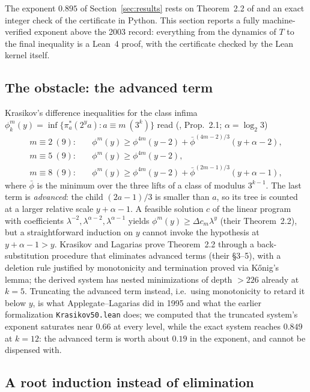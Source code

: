 \documentclass[11pt]{article}
\newcommand{\code}[1]{\texttt{#1}}
\begin{document}
The exponent $0.895$ of Section~\ref{sec:results} rests on
Theorem~2.2 of \cite{kl} and an exact integer check of the certificate
in Python. This section reports a fully machine-verified exponent
above the 2003 record: everything from the dynamics of $T$ to the
final inequality is a Lean~4 proof, with the certificate checked by
the Lean kernel itself.

\subsection*{The obstacle: the advanced term}

Krasikov's difference inequalities for the class infima
$\phi^m_k(y) = \inf\{\pi^*_a(2^y a) : a \equiv m \ (3^k)\}$ read
(\cite{kl}, Prop.~2.1; $\alpha = \log_2 3$)
\begin{align*}
m \equiv 2\ (9):&\quad \phi^m(y) \ge \phi^{4m}(y-2) + \bar\phi^{(4m-2)/3}(y+\alpha-2),\\
m \equiv 5\ (9):&\quad \phi^m(y) \ge \phi^{4m}(y-2),\\
m \equiv 8\ (9):&\quad \phi^m(y) \ge \phi^{4m}(y-2) + \bar\phi^{(2m-1)/3}(y+\alpha-1),
\end{align*}
where $\bar\phi$ is the minimum over the three lifts of a class of
modulus $3^{k-1}$. The last term is \emph{advanced}: the child
$(2a-1)/3$ is smaller than $a$, so its tree is counted at a larger
relative scale $y + \alpha - 1$. A feasible solution $c$ of the linear
program with coefficients $\lambda^{-2}, \lambda^{\alpha-2},
\lambda^{\alpha-1}$ yields $\phi^m(y) \ge \Delta c_m \lambda^y$
(their Theorem~2.2), but a straightforward induction on $y$ cannot
invoke the hypothesis at $y + \alpha - 1 > y$. Krasikov and Lagarias
prove Theorem~2.2 through a back-substitution procedure that
eliminates advanced terms (their \S3--5), with a deletion rule
justified by monotonicity and termination proved via K\H{o}nig's
lemma; the derived system has nested minimizations of depth $> 226$
already at $k = 5$. Truncating the advanced term instead, i.e.\ using
monotonicity to retard it below $y$, is what Applegate--Lagarias did
in 1995 and what the earlier formalization \code{Krasikov50.lean}
does; we computed that the truncated system's exponent saturates near
$0.66$ at every level, while the exact system reaches $0.849$ at
$k = 12$: the advanced term is worth about $0.19$ in the exponent, and
cannot be dispensed with.

\subsection*{A root induction instead of elimination}
\end{document}
